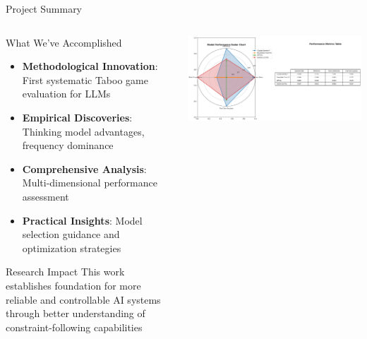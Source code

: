 \documentclass[aspectratio=169]{beamer}
\begin{document}
\begin{frame}{Project Summary}
\begin{columns}[c]
\begin{column}{0.5\textwidth}
\begin{block}{What We've Accomplished}
\begin{itemize}
    \item \textbf{Methodological Innovation}: First systematic Taboo game evaluation for LLMs
    \item \textbf{Empirical Discoveries}: Thinking model advantages, frequency dominance
    \item \textbf{Comprehensive Analysis}: Multi-dimensional performance assessment
    \item \textbf{Practical Insights}: Model selection guidance and optimization strategies
\end{itemize}
\end{block}

\begin{alertblock}{Research Impact}
This work establishes foundation for more reliable and controllable AI systems through better understanding of constraint-following capabilities
\end{alertblock}
\end{column}

\begin{column}{0.48\textwidth}
\begin{center}
\includegraphics[width=\textwidth]{comprehensive_figures/figure7_radar.png}
\end{center}
\end{column}
\end{columns}
\end{frame}
\end{document}
